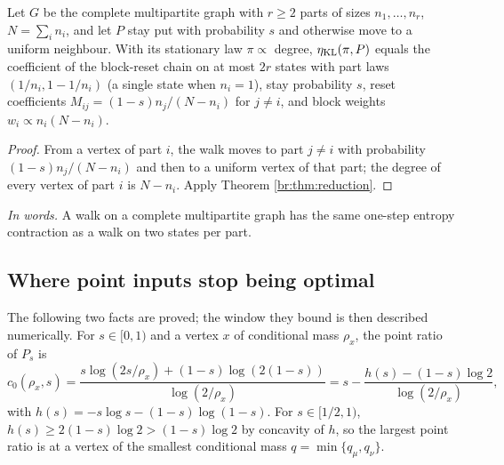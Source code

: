 \begin{corollary}\label{br:cor:multi}
Let \(G\) be the complete multipartite graph with \(r\ge2\) parts of sizes
\(n_1,\dots,n_r\), \(N=\sum_in_i\), and let \(P\) stay put with probability
\(s\) and otherwise move to a uniform neighbour. With its stationary law
\(\pi\propto\) degree, \(\eta_{\mathrm{KL}}(\pi,P)\) equals the coefficient of the
block-reset chain on at most \(2r\) states with part laws
\((1/n_i,1-1/n_i)\) (a single state when \(n_i=1\)), stay probability \(s\),
reset coefficients \(M_{ij}=(1-s)n_j/(N-n_i)\) for \(j\ne i\), and block
weights \(w_i\propto n_i(N-n_i)\).
\end{corollary}
\begin{proof}
From a vertex of part \(i\), the walk moves to part \(j\ne i\) with
probability \((1-s)n_j/(N-n_i)\) and then to a uniform vertex of that part;
the degree of every vertex of part \(i\) is \(N-n_i\). Apply Theorem
\ref{br:thm:reduction}.
\end{proof}

\noindent\textit{In words.} A walk on a complete multipartite graph has the
same one-step entropy contraction as a walk on two states per part.

\subsection{Where point inputs stop being optimal}

The following two facts are proved; the window they bound is then described
numerically. For \(s\in[0,1)\) and a vertex \(x\) of conditional mass
\(\rho_x\), the point ratio of \(P_s\) is
\[
c_0(\rho_x,s)=\frac{s\log(2s/\rho_x)+(1-s)\log(2(1-s))}{\log(2/\rho_x)}
=s-\frac{h(s)-(1-s)\log2}{\log(2/\rho_x)},
\]
with \(h(s)=-s\log s-(1-s)\log(1-s)\). For \(s\in[1/2,1)\),
\(h(s)\ge2(1-s)\log2>(1-s)\log2\) by concavity of \(h\), so the largest
point ratio is at a vertex of the smallest conditional mass
\(q=\min\{q_\mu,q_\nu\}\).

